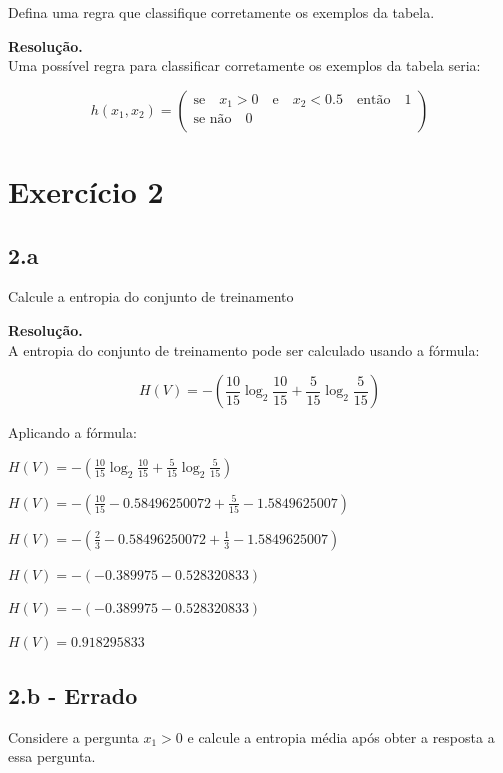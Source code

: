 \documentclass[12pt,letterpaper]{article}
\newcommand\answer{\textbf{Resolução.}\xspace}
\begin{document}
Defina uma regra que classifique corretamente os exemplos da tabela.

\answer \\

Uma possível regra para classificar corretamente os exemplos da tabela seria:

\begin{equation}
	h(x_1, x_2) =
	\begin{pmatrix}
		\textrm{se} \quad x_1 > 0 \quad \textrm{e} \quad x_2 < 0.5 \quad \textrm{então} \quad 1 \\
		\textrm{se não} \quad 0 \\
	\end{pmatrix}
\end{equation}

\section*{Exercício 2}

\subsection*{2.a}

Calcule a entropia do conjunto de treinamento

\answer \\

A entropia do conjunto de treinamento pode ser calculado usando a fórmula:

\[
	H(V) = - (\frac{10}{15}\log_2\frac{10}{15} + \frac{5}{15}\log_2\frac{5}{15})
\]

Aplicando a fórmula:

$H(V) = - (\frac{10}{15}\log_2\frac{10}{15} + \frac{5}{15}\log_2\frac{5}{15})$

$H(V) = - (\frac{10}{15}-0.58496250072 + \frac{5}{15}-1.5849625007)$

$H(V) = - (\frac{2}{3}-0.58496250072 + \frac{1}{3}-1.5849625007)$

$H(V) = - (-0.389975 -0.528320833)$

$H(V) = - (-0.389975 -0.528320833)$

$H(V) = 0.918295833$

\subsection*{2.b - Errado}

Considere a pergunta $x_1 > 0$ e calcule a entropia média após obter a resposta a essa pergunta.
\end{document}
